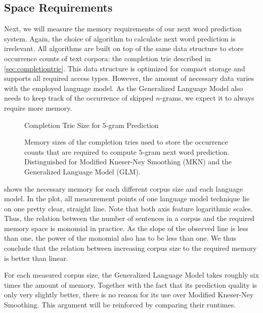 \subsection{Space Requirements}
\label{subsec:evaluation-topkjoin-space}

Next, we will measure the memory requirements of our next word prediction
system.
Again, the choice of algorithm to calculate next word prediction is irrelevant.
All algorithms are built on top  of the same data structure to store occurrence
counts of text corpora: the completion trie described in
\cref{sec:completiontrie}.
This data structure is optimized for compact storage and supports all required
access types.
However, the amount of necessary data varies with the employed language model.
As the Generalized Language Model also needs to keep track of the occurrence
of skipped $n$-grams, we expect it to always require more memory.

\begin{figure}
  \centering
  Completion Trie Size for $5$-gram Prediction
  \\[1.5ex]
  \begin{minipage}{0.7\textwidth}
    \centering
    
  \end{minipage}
  \caption{Memory sizes of the completion tries used to store the occurrence
    counts that are required to compute $5$-gram next word prediction.
    Distinguished for Modified Kneser-Ney Smoothing (MKN) and the Generalized
    Language Model (GLM).}
  \label{fig:evaluation-trie-size}
\end{figure}

 shows the necessary memory for each different
corpus size and each language model.
In the plot, all measurement points of one language model technique lie on one
pretty clear, straight line.
Note that both axis feature logarithmic scales.
Thus, the relation between the number of sentences in a corpus and the required
memory space is monomial in practice.
As the slope of the observed line is less than one, the power of the monomial
also has to be less than one.
We thus conclude that the relation between increasing corpus size to the
required memory is better than linear.

For each measured corpus size, the Generalized Language Model takes roughly
six times the amount of memory.
Together with the fact that its prediction quality is only very slightly better,
there is no reason for its use over Modified Kneser-Ney Smoothing.
This argument will be reinforced by comparing their runtimes.

